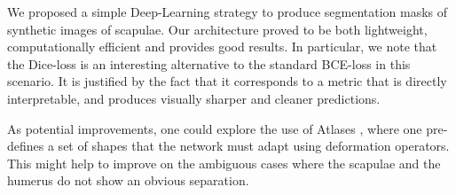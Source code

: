 \documentclass[11pt]{article}
\begin{document}
We proposed a simple Deep-Learning strategy to produce segmentation masks of synthetic
images of scapulae.
Our architecture proved to be both lightweight, computationally efficient and
provides good results.
In particular, we note that the Dice-loss is an interesting alternative to the
standard BCE-loss in this scenario. It is justified by the fact that it corresponds
to a metric that is directly interpretable, and produces visually sharper and cleaner predictions.

As potential improvements, one could explore the use of Atlases \cite{vakalopoulou18},
where one pre-defines a set of shapes that the network must adapt using deformation operators.
This might help to improve on the ambiguous cases where the scapulae and the humerus do
not show an obvious separation.


\printbibliography
\end{document}
